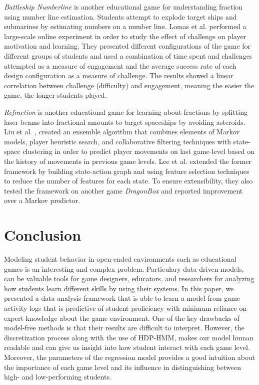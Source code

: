 \documentclass{sigchi}
\begin{document}
\textit {Battleship Numberline} is another educational game for understanding fraction using number line estimation. Students attempt to explode target ships and submarines by estimating numbers on a number line. Lomas et al. \cite{lomas2013optimizing} performed a large-scale online experiment in order to study the effect of challenge on player motivation and learning. They presented different configurations of the game for different groups of students and used a combination of time spent and challenges attempted as a measure of engagement and the average success rate of each design configuration as a measure of challenge. The results showed a linear correlation between challenge (difficulty) and engagement, meaning the easier the game, the longer students played.

\textit {Refraction} is another educational game for learning about fractions by splitting laser beams into fractional amounts to target spaceships by avoiding asteroids. Liu et al. \cite{liu2013predicting}, created an ensemble algorithm that combines elements of Markov models, player heuristic search, and collaborative filtering techniques with state-space clustering in order to predict player movements on last game-level based on the history of movements in previous game levels. Lee et al. \cite{lee2014learning} extended the former framework by building state-action graph and using feature selection techniques to reduce the number of features for each state. To ensure extensibility, they also tested the framework on another game \textit {DragonBox} and reported improvement over a Markov predictor.

\section{Conclusion}
Modeling student behavior in open-ended environments such as educational games is an interesting and complex problem. Particulary data-driven models, can be valuable tools for game designers, educators, and researchers for analyzing how students learn different skills by using their systems.
In this paper, we presented a data analysis framework that is able to learn a model from game activity logs that is predictive of student proficiency with minimum reliance on expert knowledge about the game environment. 
One of the key drawbacks of model-free methods is that their results are difficult to interpret. 
However, the discretization process along with the use of HDP-HMM, makes our model human readable and can give us insight into how student interact with each game level.
Moreover, the parameters of the regression model provides a good intuition about the importance of each game level and its influence in distinguishing between high- and low-performing students.
\end{document}
